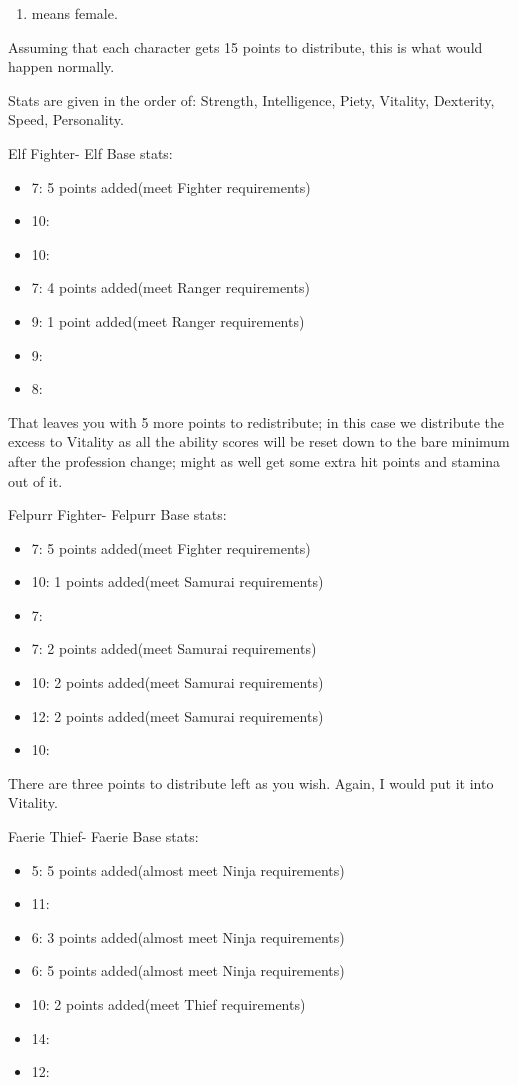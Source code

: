 \documentclass[12pt]{article}
\providecommand{\tightlist}{%
  \setlength{\itemsep}{0pt}\setlength{\parskip}{0pt}}
\begin{document}
\begin{enumerate}
\def\labelenumi{(\Alph{enumi})}
\setcounter{enumi}{5}
\tightlist
\item
  means female.
\end{enumerate}

Assuming that each character gets 15 points to distribute, this is what
would happen normally.

Stats are given in the order of: Strength, Intelligence, Piety,
Vitality, Dexterity, Speed, Personality.

Elf Fighter- Elf Base stats:

\begin{itemize}
\tightlist
\item
  7: 5 points added(meet Fighter requirements)
\item
  10:
\item
  10:
\item
  7: 4 points added(meet Ranger requirements)
\item
  9: 1 point added(meet Ranger requirements)
\item
  9:
\item
  8:
\end{itemize}

That leaves you with 5 more points to redistribute; in this case we
distribute the excess to Vitality as all the ability scores will be
reset down to the bare minimum after the profession change; might as
well get some extra hit points and stamina out of it.

Felpurr Fighter- Felpurr Base stats:

\begin{itemize}
\tightlist
\item
  7: 5 points added(meet Fighter requirements)
\item
  10: 1 points added(meet Samurai requirements)
\item
  7:
\item
  7: 2 points added(meet Samurai requirements)
\item
  10: 2 points added(meet Samurai requirements)
\item
  12: 2 points added(meet Samurai requirements)
\item
  10:
\end{itemize}

There are three points to distribute left as you wish. Again, I would
put it into Vitality.

Faerie Thief- Faerie Base stats:

\begin{itemize}
\tightlist
\item
  5: 5 points added(almost meet Ninja requirements)
\item
  11:
\item
  6: 3 points added(almost meet Ninja requirements)
\item
  6: 5 points added(almost meet Ninja requirements)
\item
  10: 2 points added(meet Thief requirements)
\item
  14:
\item
  12:
\end{itemize}
\end{document}
